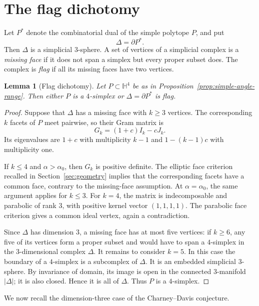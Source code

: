 \documentclass[12pt,a4paper]{article}
\theoremstyle{thmstyleone}
\newtheorem{lemma}[theorem]{Lemma}
\theoremstyle{thmstylethree}
\theoremstyle{thmstyletwo}
\newcommand{\HH}{\mathbb H}
\begin{document}
\section{The flag dichotomy}\label{sec:flag}

Let $P^*$ denote the combinatorial dual of the simple polytope $P$, and put
\[
 \Delta=\partial P^*.
\]
Then $\Delta$ is a simplicial $3$-sphere.  A set of vertices of a simplicial
complex is a \emph{missing face} if it does not span a simplex but every
proper subset does.  The complex is \emph{flag} if all its missing faces have
two vertices.

\begin{lemma}[Flag dichotomy]\label{lem:flag-dichotomy}
Let $P\subset\HH^4$ be as in Proposition~\ref{prop:simple-angle-range}.  Then
either $P$ is a $4$-simplex or $\Delta=\partial P^*$ is flag.
\end{lemma}

\begin{proof}
Suppose that $\Delta$ has a missing face with $k\geq3$ vertices.  The
corresponding $k$ facets of $P$ meet pairwise, so their Gram matrix is
\begin{equation}\label{eq:k-face-Gram}
 G_k=(1+c)I_k-cJ_k.
\end{equation}
Its eigenvalues are $1+c$ with multiplicity $k-1$ and
$1-(k-1)c$ with multiplicity one.

If $k\leq4$ and $\alpha>\alpha_0$, then $G_k$ is positive definite.  The
elliptic face criterion recalled in Section~\ref{sec:geometry} implies that the corresponding
facets have a common face, contrary to the missing-face assumption.  At
$\alpha=\alpha_0$, the same argument applies for $k\leq3$.  For $k=4$, the
matrix is indecomposable and parabolic of rank $3$, with positive kernel
vector $(1,1,1,1)$.  The parabolic face
criterion gives a common ideal vertex, again a contradiction.

Since $\Delta$ has dimension $3$, a missing face has at most five vertices:
if $k\geq6$, any five of its vertices form a proper subset and would have to
span a $4$-simplex in the $3$-dimensional complex $\Delta$.
It remains to consider $k=5$.  In this case the boundary of a $4$-simplex is
a subcomplex of $\Delta$.  It is an embedded simplicial $3$-sphere.  By
invariance of domain, its image is open in the connected $3$-manifold
$|\Delta|$; it is also closed.  Hence it is all of $\Delta$.  Thus $P$ is a
$4$-simplex.
\end{proof}

We now recall the dimension-three case of the Charney--Davis conjecture.
\end{document}
